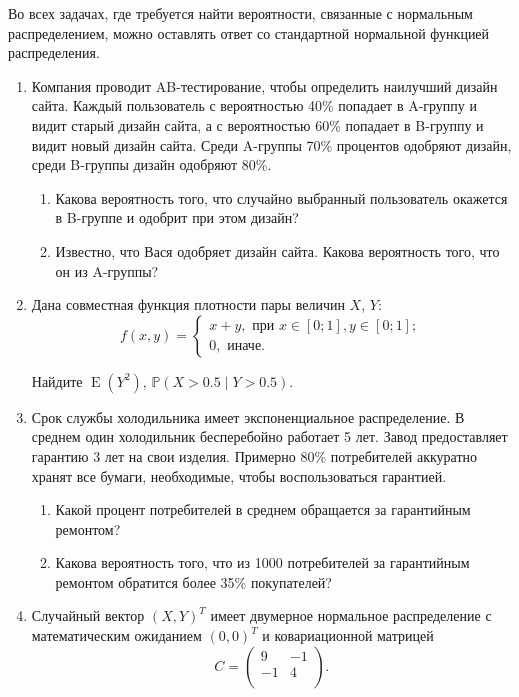 \documentclass[12pt]{article}
\DeclareMathOperator{\E}{E}
\def \P{\mathbb{P}}
\begin{document}
Во всех задачах, где требуется найти вероятности, связанные с нормальным распределением, можно оставлять ответ со стандартной нормальной функцией распределения. 

\begin{enumerate}

\item Компания проводит AB-тестирование, чтобы определить наилучший дизайн сайта. 
Каждый пользователь с вероятностью 40\% попадает в A-группу и видит старый дизайн сайта, 
а с вероятностью 60\% попадает в B-группу и видит новый дизайн сайта. 
Среди A-группы 70\% процентов одобряют дизайн, среди B-группы дизайн одобряют 80\%.

\begin{enumerate}
  \item Какова вероятность того, что случайно выбранный пользователь окажется в B-группе и одобрит при этом дизайн?
  \item Известно, что Вася одобряет дизайн сайта. Какова вероятность того, что он из A-группы?
\end{enumerate}

  \item Дана совместная функция плотности пары величин $X$, $Y$:
  \[
    f(x, y) = \begin{cases} 
      x+ y, \text{ при } x\in [0;1], y\in [0;1]; \\
      0, \text{ иначе.}
    \end{cases}
  \]

Найдите $\E(Y^2)$, $\P(X > 0.5 \mid Y > 0.5)$.


\item Срок службы холодильника имеет экспоненциальное распределение. В среднем один холодильник
бесперебойно работает 5 лет. Завод предоставляет гарантию 3 лет на свои изделия. 
Примерно 80\% потребителей аккуратно хранят все бумаги, необходимые, чтобы воспользоваться
гарантией.

\begin{enumerate}
  \item Какой процент потребителей в среднем обращается за гарантийным ремонтом?
  \item Какова вероятность того, что из 1000 потребителей за гарантийным ремонтом обратится более 35\%
покупателей?
\end{enumerate}

\item Случайный вектор $(X,Y)^T$ имеет двумерное нормальное распределение
с математическим ожиданием $(0,0)^T$ и ковариационной матрицей
\[
C = \begin{pmatrix}
9 & -1 \\
-1 & 4 \\
\end{pmatrix}.
\]


\end{enumerate}
\end{document}
